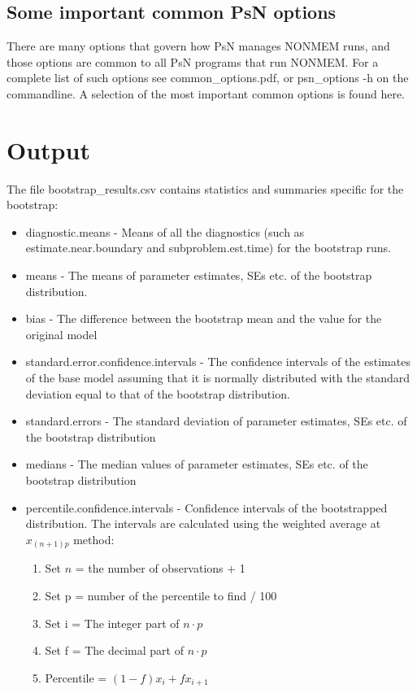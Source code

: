 \subsection{Some important common PsN options}
There are many options that govern how PsN manages NONMEM runs, and
those options are common to all PsN programs that run NONMEM.
For a complete list of such options see common\_options.pdf, 
or psn\_options -h on the commandline. A selection of
the most important common options is found here.



\section{Output}
The file bootstrap\_results.csv contains statistics and summaries specific for the bootstrap:
\begin{itemize}
    \item diagnostic.means - Means of all the diagnostics (such as estimate.near.boundary and subproblem.est.time) for the bootstrap runs.
    \item means - The means of parameter estimates, SEs etc. of the bootstrap distribution.
    \item bias - The difference between the bootstrap mean and the value for the original model
    \item standard.error.confidence.intervals - The confidence intervals of the estimates of the base model assuming that it is normally distributed with the standard deviation equal to that of the bootstrap distribution. 
    \item standard.errors - The standard deviation of parameter estimates, SEs etc. of the bootstrap distribution
    \item medians - The median values of parameter estimates, SEs etc. of the bootstrap distribution
    \item percentile.confidence.intervals - Confidence intervals of the bootstrapped distribution. The intervals are calculated using the weighted average at $x_{(n+1)p}$ method:
    \begin{enumerate}
        \item Set $n$ = the number of observations + 1
        \item Set p = number of the percentile to find / 100
        \item Set i = The integer part of $n\cdot p$
        \item Set f = The decimal part of $n\cdot p$
        \item Percentile = $(1-f)x_i + fx_{i+1}$
    \end{enumerate}
\end{itemize}

